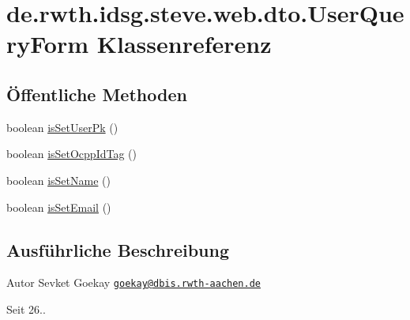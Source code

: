 \hypertarget{classde_1_1rwth_1_1idsg_1_1steve_1_1web_1_1dto_1_1_user_query_form}{\section{de.\+rwth.\+idsg.\+steve.\+web.\+dto.\+User\+Query\+Form Klassenreferenz}
\label{classde_1_1rwth_1_1idsg_1_1steve_1_1web_1_1dto_1_1_user_query_form}
}
\subsection*{Öffentliche Methoden}
\begin{DoxyCompactItemize}
\item 
boolean \hyperlink{classde_1_1rwth_1_1idsg_1_1steve_1_1web_1_1dto_1_1_user_query_form_ac956d9ab14e2083c418e2ba59e5d5e85}{is\+Set\+User\+Pk} ()
\item 
boolean \hyperlink{classde_1_1rwth_1_1idsg_1_1steve_1_1web_1_1dto_1_1_user_query_form_a5826f0ebb1613167be281f5d42aafbfe}{is\+Set\+Ocpp\+Id\+Tag} ()
\item 
boolean \hyperlink{classde_1_1rwth_1_1idsg_1_1steve_1_1web_1_1dto_1_1_user_query_form_a951e82aded99ca9f461fcbba4d31d5b9}{is\+Set\+Name} ()
\item 
boolean \hyperlink{classde_1_1rwth_1_1idsg_1_1steve_1_1web_1_1dto_1_1_user_query_form_ac92b8b53a02b3f0c1e6a84111fb0a3b1}{is\+Set\+Email} ()
\end{DoxyCompactItemize}


\subsection{Ausführliche Beschreibung}
\begin{DoxyAuthor}{Autor}
Sevket Goekay \href{mailto:goekay@dbis.rwth-aachen.de}{\tt goekay@dbis.\+rwth-\/aachen.\+de} 
\end{DoxyAuthor}
\begin{DoxySince}{Seit}
26.. 
\end{DoxySince}


